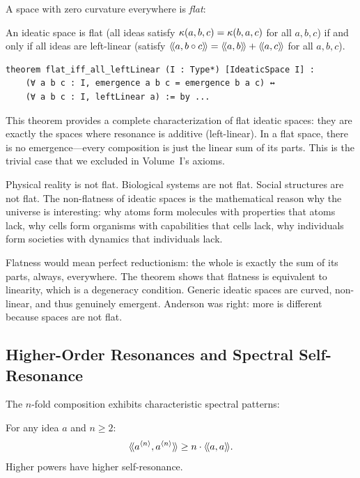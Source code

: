 A space with zero curvature everywhere is \emph{flat}:

\begin{theorem}
\label{thm:flat-iff-leftlinear}
An ideatic space is flat (all ideas satisfy $\kappa(a,b,c) = \kappa(b,a,c)$
for all $a,b,c$) if and only if all ideas are left-linear (satisfy
$\langle\!\langle a, b \circ c \rangle\!\rangle = \langle\!\langle a, b \rangle\!\rangle + \langle\!\langle a, c \rangle\!\rangle$ for all $a,b,c$).
\end{theorem}

\begin{lstlisting}[caption={Flatness characterization (IDT\_v3\_Emergence.lean)}]
theorem flat_iff_all_leftLinear (I : Type*) [IdeaticSpace I] :
    (∀ a b c : I, emergence a b c = emergence b a c) ↔
    (∀ a b c : I, leftLinear a) := by ...
\end{lstlisting}

\begin{interpretation}
This theorem provides a complete characterization of flat ideatic spaces: they
are exactly the spaces where resonance is additive (left-linear). In a flat
space, there is no emergence---every composition is just the linear sum of its
parts. This is the trivial case that we excluded in Volume~I's axioms.

Physical reality is not flat. Biological systems are not flat. Social structures
are not flat. The non-flatness of ideatic spaces is the mathematical reason why
the universe is interesting: why atoms form molecules with properties that atoms
lack, why cells form organisms with capabilities that cells lack, why individuals
form societies with dynamics that individuals lack.

Flatness would mean perfect reductionism: the whole is exactly the sum of its
parts, always, everywhere. The theorem shows that flatness is equivalent to
linearity, which is a degeneracy condition. Generic ideatic spaces are curved,
non-linear, and thus genuinely emergent. Anderson was right: more is different
because spaces are not flat.
\end{interpretation}

\subsection{Higher-Order Resonances and Spectral Self-Resonance}

The $n$-fold composition exhibits characteristic spectral patterns:

\begin{theorem}
\label{thm:spectral-self-resonance}
For any idea $a$ and $n \geq 2$:
\[
  \langle\!\langle a^{\langle n \rangle}, a^{\langle n \rangle} \rangle\!\rangle \geq n \cdot \langle\!\langle a, a \rangle\!\rangle.
\]
Higher powers have higher self-resonance.
\end{theorem}

